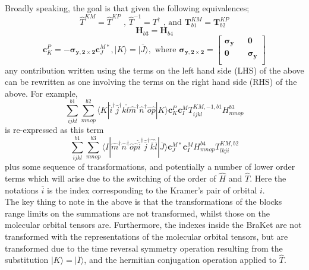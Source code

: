 \documentclass[12pt]{article}
\begin{document}
\noindent Broadly speaking, the goal is that given the following equivalences;
\begin{equation*}
\hat{T}^{KM}= \hat{T}^{KP} \text{\ , \ \ \  }
\hat{T}^{-1} = T^{\dagger} \text{\ , and \ \ \ }
\mathbf{T}_{b1}^{KM}= \mathbf{T}_{b2}^{KP} 
\end{equation*}
\begin{equation*} 
\mathbf{H}_{b3} = \mathbf{H}_{b4} 
\end{equation*}
\begin{equation*} 
\mathbf{c}_{K}^{P} =  -\boldsymbol{\sigma_{y,2\times 2}}\mathbf{c}_{J}^{M*}, 
|K\rangle =  |\overline{J}\rangle, 
\text{ \ \ \ where  \ \ \ } 
\boldsymbol{\sigma_{y,2\times 2}} = 
\begin{bmatrix}
\boldsymbol{\sigma_{y}} && \mathbf{0} \\ 
\mathbf{0} && \boldsymbol{\sigma_{y}} \\
\end{bmatrix}
\end{equation*}
\noindent any contribution written using the terms on the left
hand side (LHS) of the above can be rewritten as one involving the terms on the
right hand side (RHS) of the above. For example, 
\begin{equation*}
\sum_{ijkl}^{b1}\sum_{mnop}^{b2} \langle K |
\hat{i}^{\dagger}\hat{j}^{\dagger}\hat{k}\hat{l}\hat{m}^{\dagger}\hat{n}^{\dagger}\hat{o}\hat{p} | K \rangle 
\mathbf{c}_{K}^{P}\mathbf{c}_{I}^{M}T_{ijkl}^{KM,-1,b1}H^{b3}_{mnop}
\end{equation*}
is re-expressed as this term
\begin{equation*}
\sum_{ijkl}^{b1}\sum^{b3}_{mnop}
\langle I |
\hat{m}^{\dagger}\hat{n}^{\dagger}\hat{o}\hat{p} 
\hat{\overline{i}}^{\dagger}\hat{\overline{j}}^{\dagger}\hat{\overline{k}}\hat{\overline{l}}
| \overline{J} \rangle 
\mathbf{c}_{J}^{M*} \mathbf{c}_{I}^{M}
H^{b4}_{mnop}T_{lkji}^{KM,b2}
\end{equation*}
plus some sequence of transformations, and potentially a number of lower order terms which will arise due to the switching of
the order of $\hat{H}$ and $\hat{T}$. Here the notations $\overline{i}$ is the index corresponding to the Kramer's pair of
orbital $i$. \\

\noindent The key thing to note in the above is that the transformations of the blocks range limits on the
summations are not transformed, whilst those on the molecular orbital tensors are. Furthermore, the indexes inside the BraKet 
are not transformed with the representations of the molecular orbital tensors, but are transformed due 
to the time reversal symmetry operation resulting from the substitution $|K\rangle = |\overline{I}\rangle$, and
the hermitian conjugation operation applied to $\hat{T}$.\\
\end{document}
